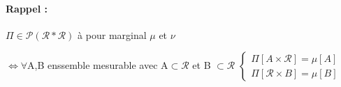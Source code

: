 \documentclass[11pt, a4paper]{article}
\begin{document}
\paragraph{Rappel :}
$\Pi \in \mathcal{P}(\mathcal{R}*\mathcal{R})$ à pour marginal $\mu$ et $\nu$ 
\vspace{5mm}

$\Leftrightarrow \forall $A,B enssemble mesurable avec A$ \subset \mathcal{R}$ et B $\subset \mathcal{R}$
$\left\{
\begin{array}{l}
\Pi[A\times\mathcal{R}] = \mu[A] \\
\Pi[\mathcal{R}\times B] = \mu[B]
\end{array}
\right.$
\end{document}

